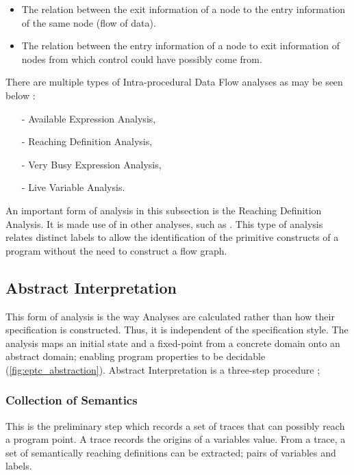 		\begin{itemize}
			\item The relation between the exit information of a node to the entry information of the same node (flow of data).
			\item The relation between the entry information of a node to exit information of nodes from which control could have possibly come from. 
		\end{itemize}
	
		\par There are multiple types of Intra-procedural Data Flow analyses as may be seen below \cite[pp.33--51]{nielson2004principlesofPA}:
		\begin{itemize}
			\item[-] Available Expression Analysis,
			\item[-] Reaching Definition Analysis,
			\item[-] Very Busy Expression Analysis,
			\item[-] Live Variable Analysis.
		\end{itemize}
	
		\par An important form of analysis in this subsection is the Reaching Definition Analysis. It is made use of in other analyses, such as .
		This type of analysis relates distinct labels to allow the identification of the primitive constructs of a program without the need to construct a flow graph.
	
		\subsection{Abstract Interpretation}
		\label{subsec:abstractinterp}
		\par This form of analysis is the way Analyses are calculated rather than how their specification is constructed. Thus, it is independent of the specification style.
		The analysis maps an initial state and a fixed-point from a concrete domain onto an abstract domain; enabling program properties to be decidable (\ref{fig:eptc_abstraction}). Abstract Interpretation is a three-step procedure \cite[pp.13--17]{nielson2004principlesofPA};
	
			\subsubsection*{Collection of Semantics}
			\par This is the preliminary step which records a set of traces that can possibly reach a program point. A trace records the origins of a variables value.
			From a trace, a set of semantically reaching definitions can be extracted; pairs of variables and labels.
			
